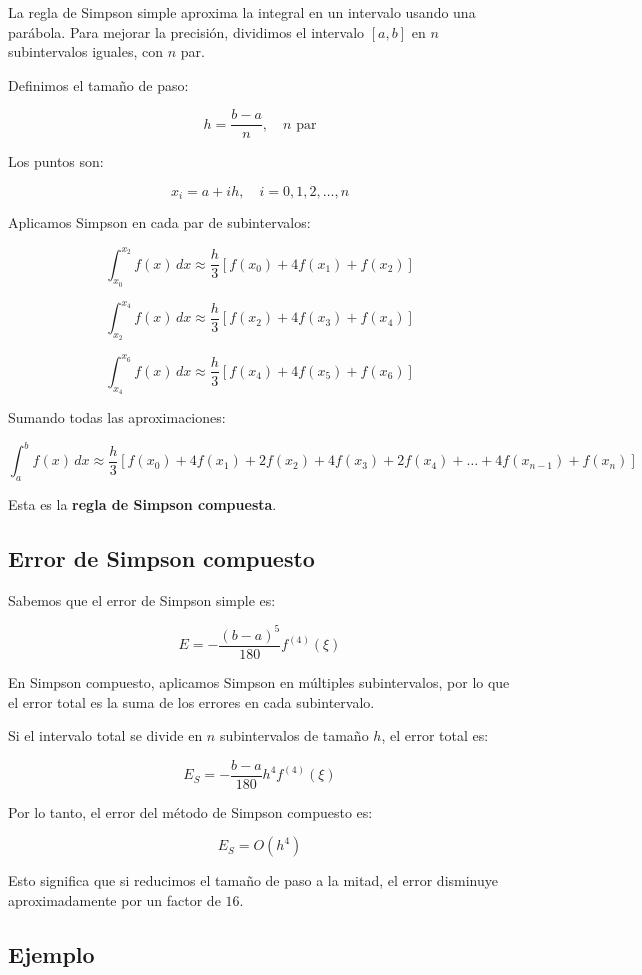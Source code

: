\documentclass[12pt,a4paper]{article}
\begin{document}
La regla de Simpson simple aproxima la integral en un intervalo usando una parábola.
Para mejorar la precisión, dividimos el intervalo $[a,b]$ en $n$ subintervalos iguales, con $n$ par.

Definimos el tamaño de paso:

\[
h = \frac{b-a}{n}, \quad n \text{ par}
\]

Los puntos son:

\[
x_i = a + ih, \quad i=0,1,2,\dots,n
\]

Aplicamos Simpson en cada par de subintervalos:

\[
\int_{x_0}^{x_2} f(x)\,dx \approx \frac{h}{3}[f(x_0) + 4f(x_1) + f(x_2)]
\]

\[
\int_{x_2}^{x_4} f(x)\,dx \approx \frac{h}{3}[f(x_2) + 4f(x_3) + f(x_4)]
\]

\[
\int_{x_4}^{x_6} f(x)\,dx \approx \frac{h}{3}[f(x_4) + 4f(x_5) + f(x_6)]
\]

Sumando todas las aproximaciones:

\[
\int_a^b f(x)\,dx \approx \frac{h}{3}
\left[
f(x_0)
+ 4f(x_1)
+ 2f(x_2)
+ 4f(x_3)
+ 2f(x_4)
+ \dots
+ 4f(x_{n-1})
+ f(x_n)
\right]
\]

Esta es la \textbf{regla de Simpson compuesta}.

\subsection{Error de Simpson compuesto}

Sabemos que el error de Simpson simple es:

\[
E = -\frac{(b-a)^5}{180} f^{(4)}(\xi)
\]

En Simpson compuesto, aplicamos Simpson en múltiples subintervalos, por lo que el error total es la suma de los errores en cada subintervalo.

Si el intervalo total se divide en $n$ subintervalos de tamaño $h$, el error total es:

\[
E_S = -\frac{b-a}{180} h^4 f^{(4)}(\xi)
\]

Por lo tanto, el error del método de Simpson compuesto es:

\[
E_S = O(h^4)
\]

Esto significa que si reducimos el tamaño de paso a la mitad, el error disminuye aproximadamente por un factor de $16$.


\subsection{Ejemplo}
\end{document}
